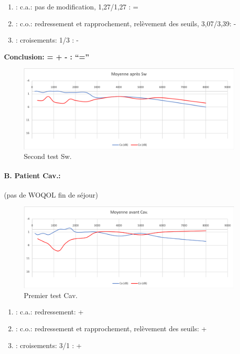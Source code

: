 	\begin{enumerate}
 		
 		\item : c.a.: pas de modification, 1,27/1,27 : =
                
 		\item : c.o.: redressement et rapprochement, relèvement des seuils, 3,07/3,39: -
 		\item : croisements: 1/3 :  -
                  
                \end{enumerate}

                \textbf{  Conclusion:  = +  -        : ``=''}

                \begin{figure}
\centering
\includegraphics[width=0.7\linewidth]{images/graphiques/sw_post.png}
\caption[Moyenne OG+OD]{Second test Sw.}
       
\label{groupecontroleimage1}
\end{figure}




\paragraph{B. Patient Cav.: }

(pas de WOQOL fin de séjour)


\begin{figure}
\centering
\includegraphics[width=0.7\linewidth]{images/graphiques/cav_pre.png}
\caption[Moyenne OG+OD]{Premier test Cav.}
       
\label{groupecontroleimage1}
\end{figure}

	\begin{enumerate}
 		
 		\item : c.a.: redressement: +
                
 		\item : c.o.: redressement et rapprochement, relèvement des seuils: +
 		\item : croisements: 3/1 :  +
                  
                \end{enumerate}

